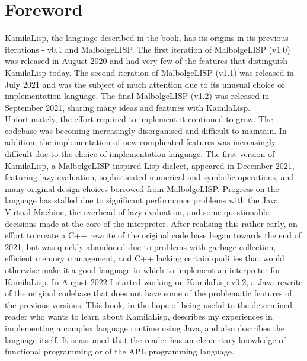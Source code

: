 
\chapter*{Foreword}
\par KamilaLisp, the language described in the book, has its origins in its previous iterations - v0.1 and MalbolgeLISP. The first iteration of MalbolgeLISP (v1.0) was released in August 2020 and had very few of the features that distinguish KamilaLisp today. The second iteration of MalbolgeLISP (v1.1) was released in July 2021 and was the subject of much attention due to its unusual choice of implementation language. The final MalbolgeLISP (v1.2) was released in September 2021, sharing many ideas and features with KamilaLisp. Unfortunately, the effort required to implement it continued to grow. The codebase was becoming increasingly disorganised and difficult to maintain. In addition, the implementation of new complicated features was increasingly difficult due to the choice of implementation language. The first version of KamilaLisp, a MalbolgeLISP-inspired Lisp dialect, appeared in December 2021, featuring lazy evaluation, sophisticated numerical and symbolic operations, and many original design choices borrowed from MalbolgeLISP. Progress on the language has stalled due to significant performance problems with the Java Virtual Machine, the overhead of lazy evaluation, and some questionable decisions made at the core of the interpreter. After realising this rather early, an effort to create a C++ rewrite of the original code base began towards the end of 2021, but was quickly abandoned due to problems with garbage collection, efficient memory management, and C++ lacking certain qualities that would otherwise make it a good language in which to implement an interpreter for KamilaLisp. In August 2022 I started working on KamilaLisp v0.2, a Java rewrite of the original codebase that does not have some of the problematic features of the previous versions. This book, in the hope of being useful to the determined reader who wants to learn about KamilaLisp, describes my experiences in implementing a complex language runtime using Java, and also describes the language itself. It is assumed that the reader has an elementary knowledge of functional programming or of the APL programming language.

